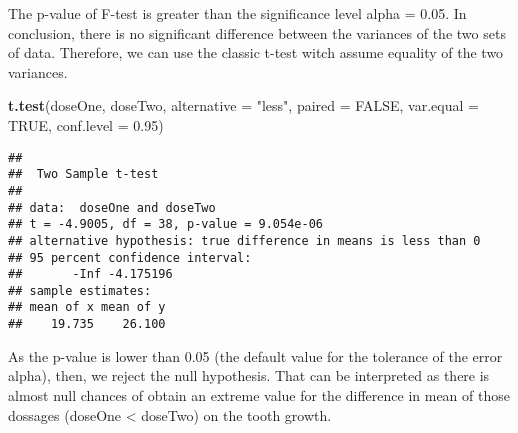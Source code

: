 \documentclass[]{article}
\newenvironment{Shaded}{\begin{snugshade}}{\end{snugshade}}
\newcommand{\KeywordTok}[1]{\textcolor[rgb]{0.13,0.29,0.53}{\textbf{#1}}}
\newcommand{\DataTypeTok}[1]{\textcolor[rgb]{0.13,0.29,0.53}{#1}}
\newcommand{\FloatTok}[1]{\textcolor[rgb]{0.00,0.00,0.81}{#1}}
\newcommand{\StringTok}[1]{\textcolor[rgb]{0.31,0.60,0.02}{#1}}
\newcommand{\OtherTok}[1]{\textcolor[rgb]{0.56,0.35,0.01}{#1}}
\newcommand{\NormalTok}[1]{#1}
\begin{document}
The p-value of F-test is greater than the significance level alpha =
0.05. In conclusion, there is no significant difference between the
variances of the two sets of data. Therefore, we can use the classic
t-test witch assume equality of the two variances.

\begin{Shaded}
\begin{Highlighting}[]
\KeywordTok{t.test}\NormalTok{(doseOne, doseTwo, }\DataTypeTok{alternative =} \StringTok{"less"}\NormalTok{, }\DataTypeTok{paired =} \OtherTok{FALSE}\NormalTok{, }\DataTypeTok{var.equal =} \OtherTok{TRUE}\NormalTok{, }\DataTypeTok{conf.level =} \FloatTok{0.95}\NormalTok{)}
\end{Highlighting}
\end{Shaded}

\begin{verbatim}
## 
##  Two Sample t-test
## 
## data:  doseOne and doseTwo
## t = -4.9005, df = 38, p-value = 9.054e-06
## alternative hypothesis: true difference in means is less than 0
## 95 percent confidence interval:
##       -Inf -4.175196
## sample estimates:
## mean of x mean of y 
##    19.735    26.100
\end{verbatim}

As the p-value is lower than 0.05 (the default value for the tolerance
of the error alpha), then, we reject the null hypothesis. That can be
interpreted as there is almost null chances of obtain an extreme value
for the difference in mean of those dossages (doseOne \textless{}
doseTwo) on the tooth growth.
\end{document}
